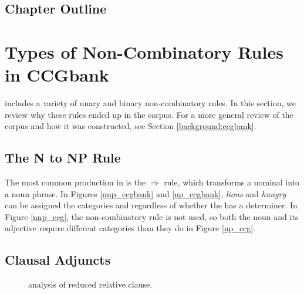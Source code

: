 \subsection{Chapter Outline}

\section{Types of Non-Combinatory Rules in CCGbank}

\ccgbank includes a variety of unary and binary non-combinatory rules. In this section, we review why these rules ended up in the corpus. For a more general review of the \ccgbank corpus and how it was constructed, see Section \ref{background:ccgbank}.

\subsection{The N to NP Rule}

The most common production in \ccgbank is the $\Rightarrow$  rule, which transforms a nominal into a noun phrase.  In Figures \ref{nnp_ccgbank} and \ref{np_ccgbank}, \emph{lions} and \emph{hungry} can be assigned the categories  and  regardless of whether the  has a determiner. In Figure \ref{nnp_ccg}, the non-combinatory rule is not used, so both the noun and its adjective require different categories than they do in Figure \ref{np_ccg}.

\subsection{Clausal Adjuncts}





\begin{figure}
\caption{\ccg analysis of reduced relative clause.}\label{ccg_obj_rel}
\end{figure}

